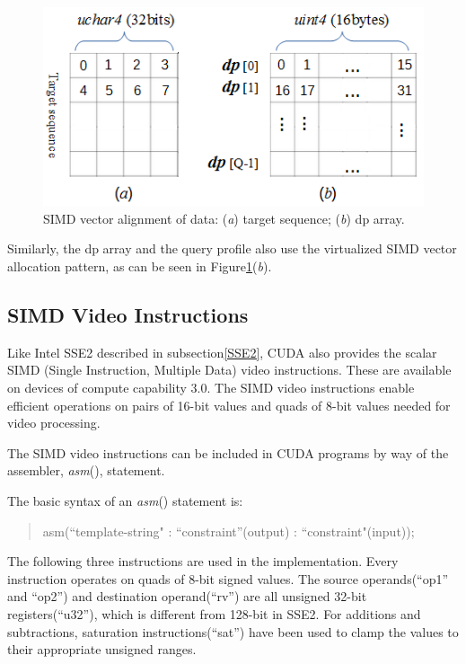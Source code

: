 \begin{figure}[!htb]
	\centering
	\includegraphics[totalheight=0.2\textheight]{Figures/simdvector.png}
	\caption{\selectfont SIMD vector alignment of data: (\textit{a}) target sequence; (\textit{b}) dp array.}
	\label{fig:simdvector}
\end{figure}

Similarly, the dp array and the query profile also use the virtualized SIMD vector allocation pattern, as can be seen in Figure\ref{fig:simdvector}(\textit{b}).

\subsection{SIMD Video Instructions}
\label{video}

Like Intel SSE2 described in subsection\ref{SSE2}, CUDA also provides the scalar SIMD (Single Instruction, Multiple Data) video instructions. These are available on devices of compute capability 3.0. The SIMD video instructions enable efficient operations on pairs of 16-bit values and quads of 8-bit values needed for video processing.

The SIMD video instructions can be included in CUDA programs by way of the assembler, \emph{asm}(), statement.

The basic syntax of an \emph{asm}() statement is:

\begin{quote}
\selectfont
 asm(``template-string" : ``constraint''(output) : ``constraint"(input));
\end{quote}

The following three instructions are used in the implementation. Every instruction operates on quads of 8-bit signed values. The source operands(“op1” and “op2”) and destination operand(“rv”) are all unsigned 32-bit registers(“u32”), which is different from 128-bit in SSE2. For additions and subtractions, saturation instructions(“sat”) have been used to clamp the values to their appropriate unsigned ranges.

